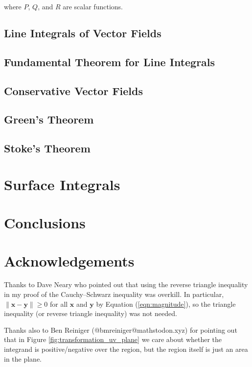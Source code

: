 \documentclass{article}
\theoremstyle{definition}
\begin{document}
\bigskip
\noindent
where $P$, $Q$, and $R$ are scalar functions.


\subsection{Line Integrals of Vector Fields}

\subsection{Fundamental Theorem for Line Integrals}

\subsection{Conservative Vector Fields}

\subsection{Green’s Theorem}

\subsection{Stoke's Theorem}


\bigskip
\section{Surface Integrals}

\bigskip
\section{Conclusions}
\label{sec:conclusions}

\section*{Acknowledgements}
Thanks to Dave Neary who pointed out that using the reverse
triangle inequality in my proof of the Cauchy–Schwarz inequality
was overkill. In particular, $\|\mathbf{x} - \mathbf{y} \| \geq
0$ for all $\mathbf{x}$ and $\mathbf{y}$ by Equation
(\ref{eqn:magnitude}), so the triangle inequality (or reverse
triangle inequality) was not needed.

\bigskip
\noindent
Thanks also to Ben Reiniger (@bmreiniger@mathstodon.xyz) for 
pointing out that in Figure \ref{fig:transformation_uv_plane} 
we care about whether the integrand is positive/negative 
over the region, but the region itself is just an area in 
the plane.
\end{document}
